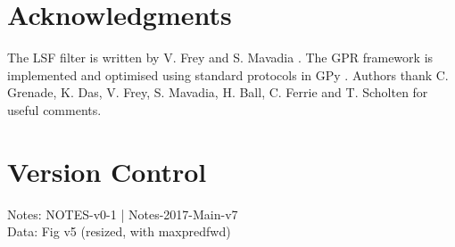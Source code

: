 \section{Acknowledgments}
 The LSF filter is written by V. Frey and S. Mavadia \cite{mavadia2017}. The GPR framework is implemented and optimised using standard protocols in GPy \cite{gpy2014}. Authors thank C. Grenade, K. Das, V. Frey, S. Mavadia, H. Ball, C. Ferrie and T. Scholten for useful comments. 
 
\section{Version Control \label{sec:main:versioncontrol}}
Notes: NOTES-v0-1 | Notes-2017-Main-v7
\\
Data: Fig v5 (resized, with maxpredfwd)
